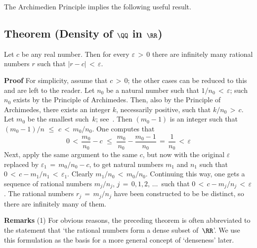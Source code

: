 \V
\V

        The Archimedien Principle implies the following useful result.

\V

            \subsection{\small{\bf Theorem} (Density of ${\QQ}$ in ${\RR}$)}
            \label{ThmB30.55}

\V

  \hspace*{\parindent}Let $c$ be any real number. Then for every ${\varepsilon}\,>\,0$
    there are infinitely many rational numbers $r$ such that $|r-c|\,<\,{\varepsilon}$.


\V

        {\bf Proof} For simplicity, assume that $c\,>\,0$; the other cases can be reduced to this and are left to the reader.
    Let $n_{0}$ be a natural number such that $1/n_{0}\,<\,{\varepsilon}$; such $n_{0}$ exists by the Principle of Archimedes.
    Then, also by the Principle of Archimedes, there exists an integer $k$, necessarily positive, such that $k/n_{0}\,>\,c$.
    Let $m_{0}$ be the smallest such~$k$; see~. Then $(m_{0}-1)$ is an integer such that $(m_{0}-1)/n\,\,{\leq}\,\,c\,<\,m_{0}/n_{0}$.
    One computes that 
        \begin{displaymath}
        0\,<\,\frac{m_{0}}{n_{0}} - c\,\,{\leq}\,\,\frac{m_{0}}{n_{0}} - \frac{m_{0}-1}{n_{0}}
     \,=\,
        \frac{1}{n_{0}}\,<\,{\varepsilon}
        \end{displaymath}
    Next, apply the same argument to the same $c$, but now with the original ${\varepsilon}$ replaced by ${\varepsilon}_{1} \,=\, m_{0}/n_{0} - c$,
    to get natural numbers $m_{1}$ and $n_{1}$ such that $0\,<\,c - m_{1}/n_{1}\,<\,{\varepsilon}_{1}$. Clearly $m_{1}/n_{0}\,<\,m_{0}/n_{0}$.
    Continuing this way, one gets a sequence of rational numbers $m_{j}/n_{j}$, $j \,=\, 0,1,2,\,{\ldots}\,$ such that $0\,<\,c-m_{j}/n_{j}\,<\,{\varepsilon}$.
    The rational numbers $r_{j} \,=\, m_{j}/n_{j}$ have been constructed to be be distinct, so there are infinitely many of them.

\V

        {\bf Remarks} (1) For obvious reasons, the preceding theorem is often abbreviated to the statement that
    `the rational numbers form a dense subset of~${\RR}$'. We use this formulation as the basis for a more general concept of `denseness' later.

